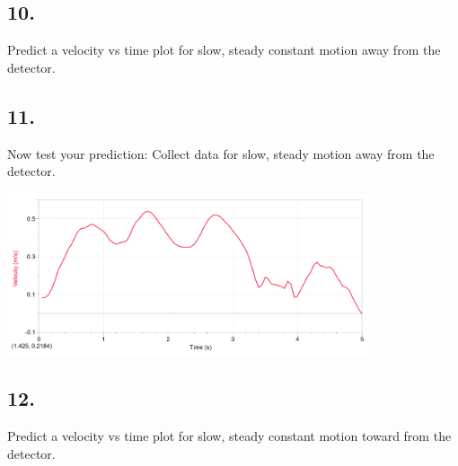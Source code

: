     \subsection*{10.}
    Predict a velocity vs time plot for slow, steady constant motion away from the detector. 

    \begin{mdframed}
        \centering
    \end{mdframed}

    \subsection*{11.}
    Now test your prediction: Collect data for slow, steady motion away from the detector.

    \begin{mdframed}
        \centering\includegraphics[width=0.8\textwidth]{image5.png}
    \end{mdframed}

    \subsection*{12.}
    Predict a velocity vs time plot for slow, steady constant motion toward from the detector. 

